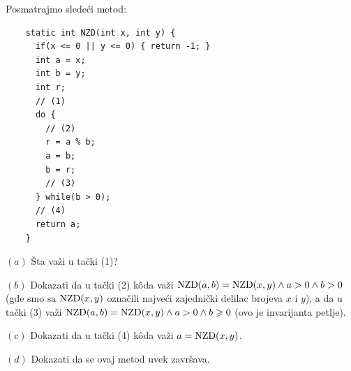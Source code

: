 \begin{EX}
  Posmatrajmo slede\'ci metod:
{\small
\begin{verbatim}
    static int NZD(int x, int y) {
      if(x <= 0 || y <= 0) { return -1; }
      int a = x;
      int b = y;
      int r;
      // (1)
      do {
        // (2)
        r = a % b;
        a = b;
        b = r;
        // (3)
      } while(b > 0);
      // (4)
      return a;
    }
\end{verbatim}
}

\medskip

\noindent
$(a)$ \v Sta va\v zi u ta\v cki (1)?

\medskip

\noindent
$(b)$ Dokazati da u ta\v cki (2) k\^oda va\v zi $\mathrm{NZD}(a, b) = \mathrm{NZD}(x, y) \land a > 0 \land b > 0$
(gde smo sa $\mathrm{NZD}(x, y)$ ozna\v cili najve\'ci zajedni\v cki delilac brojeva $x$ i $y$),
a da u ta\v cki (3) va\v zi $\mathrm{NZD}(a, b) = \mathrm{NZD}(x, y) \land a > 0 \land b \geqslant 0$ (ovo je invarijanta petlje).

\medskip

\noindent
$(c)$ Dokazati da u ta\v cki (4) k\^oda va\v zi $a = \mathrm{NZD}(x, y)$.

\medskip

\noindent
$(d)$ Dokazati da se ovaj metod uvek zavr\v sava.
\end{EX}
